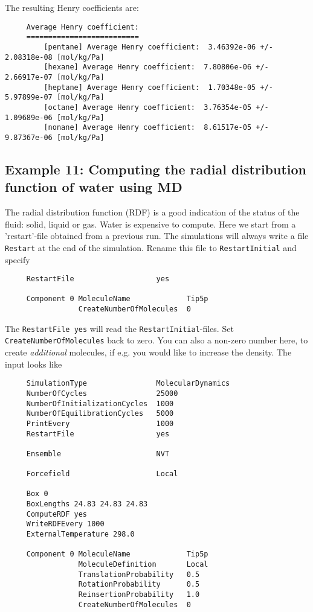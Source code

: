 \noindent
The resulting Henry coefficients are:
\begin{tiny}
\begin{verbatim}
     Average Henry coefficient:
     ==========================
         [pentane] Average Henry coefficient:  3.46392e-06 +/- 2.08318e-08 [mol/kg/Pa]
         [hexane] Average Henry coefficient:  7.80806e-06 +/- 2.66917e-07 [mol/kg/Pa]
         [heptane] Average Henry coefficient:  1.70348e-05 +/- 5.97899e-07 [mol/kg/Pa]
         [octane] Average Henry coefficient:  3.76354e-05 +/- 1.09689e-06 [mol/kg/Pa]
         [nonane] Average Henry coefficient:  8.61517e-05 +/- 9.87367e-06 [mol/kg/Pa]
\end{verbatim}
\end{tiny}

\subsection*{Example 11: Computing the radial distribution function of water using MD}

The radial distribution function (RDF) is a good indication of the status of the fluid: solid, liquid or gas.
Water is expensive to compute. Here we start from a 'restart'-file obtained from a previous run.
The simulations will always write a file \verb+Restart+
at the end of the simulation. Rename this file to \verb+RestartInitial+ and specify
\begin{tiny}
\begin{verbatim}
     RestartFile                   yes

     Component 0 MoleculeName             Tip5p
                 CreateNumberOfMolecules  0
\end{verbatim}
\end{tiny}
The \verb+RestartFile yes+ will read the \verb+RestartInitial+-files. Set \verb+CreateNumberOfMolecules+ back to zero.
You can also a non-zero number here, to create \emph{additional} molecules, if e.g. you would like to increase the density.
The input looks like
\begin{tiny}
\begin{verbatim}
     SimulationType                MolecularDynamics
     NumberOfCycles                25000
     NumberOfInitializationCycles  1000
     NumberOfEquilibrationCycles   5000
     PrintEvery                    1000
     RestartFile                   yes

     Ensemble                      NVT

     Forcefield                    Local

     Box 0
     BoxLengths 24.83 24.83 24.83
     ComputeRDF yes
     WriteRDFEvery 1000
     ExternalTemperature 298.0

     Component 0 MoleculeName             Tip5p
                 MoleculeDefinition       Local
                 TranslationProbability   0.5
                 RotationProbability      0.5
                 ReinsertionProbability   1.0
                 CreateNumberOfMolecules  0
\end{verbatim}
\end{tiny}

